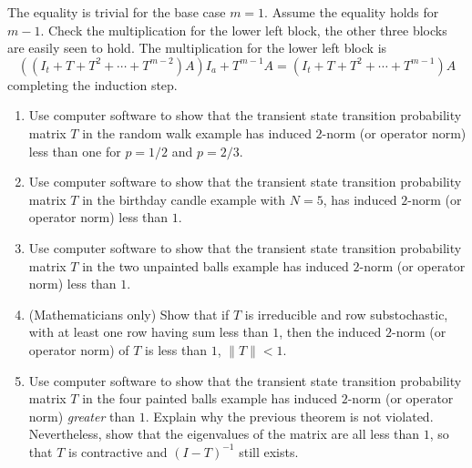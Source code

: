 \documentclass[12pt]{article}
\begin{document}
\begin{solution}
  The equality is trivial for the base case $m=1$.  Assume the
  equality holds for $m-1$.  Check  the multiplication for the
  lower left block, the other three blocks are easily seen to hold.
  The multiplication for the lower left block is
  \[
    \left( (I_t + T + T^2 + \cdots + T^{m-2})A  \right) I_a +
    T^{m-1}A = (I_t + T + T^2 + \cdots + T^{m-1})A
  \]
  completing the induction step.
\end{solution}

\begin{exercise}[label=(\alph*)]
  \begin{enumerate}
  \item Use computer software to show that the transient state transition
    probability matrix $T$ in the random walk example has induced $2$-norm (or operator norm)
    less than one for $p = 1/2$ and $p = 2/3$.
  \item Use computer software to show that the transient state transition
    probability matrix $T$ in the birthday candle example with $N=5$,
    has induced $2$-norm (or operator norm)
    less than $1$.
  \item Use computer software to show that the transient state transition
    probability matrix $T$ in the two unpainted balls example 
    has induced $2$-norm (or operator norm)
    less than $1$.
  \item (Mathematicians only) Show that if $T$ is irreducible and row substochastic,
    with at least one row having sum less than $1$, then the
induced $2$-norm (or operator norm) of \( T \) is less than \( 1 \),
\( \| T \| < 1 \).
\item  Use computer software to show that the transient state transition
    probability matrix $T$ in the four painted balls example 
    has induced $2$-norm (or operator norm)
    \emph{greater} than $1$.  Explain why the previous theorem is not
    violated.  Nevertheless, show that the eigenvalues of the matrix
    are all less than $1$, so that $T$ is contractive and $(I-T)^{-1}$
    still exists.
  \end{enumerate}
\end{exercise}
\end{document}
